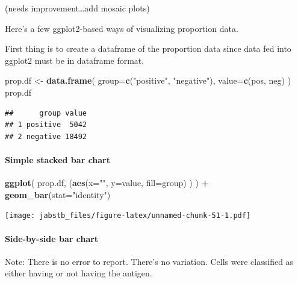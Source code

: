 \documentclass[]{book}
\newenvironment{Shaded}{\begin{snugshade}}{\end{snugshade}}
\newcommand{\DataTypeTok}[1]{\textcolor[rgb]{0.13,0.29,0.53}{#1}}
\newcommand{\KeywordTok}[1]{\textcolor[rgb]{0.13,0.29,0.53}{\textbf{#1}}}
\newcommand{\NormalTok}[1]{#1}
\newcommand{\OperatorTok}[1]{\textcolor[rgb]{0.81,0.36,0.00}{\textbf{#1}}}
\newcommand{\StringTok}[1]{\textcolor[rgb]{0.31,0.60,0.02}{#1}}
\let\oldparagraph\paragraph
\renewcommand{\paragraph}[1]{\oldparagraph{#1}\mbox{}}
\begin{document}
(needs improvement\ldots{}add mosaic plots)

Here's a few ggplot2-based ways of visualizing proportion data.

First thing is to create a dataframe of the proportion data since data fed into ggplot2 must be in dataframe format.

\begin{Shaded}
\begin{Highlighting}[]
\NormalTok{prop.df <-}\StringTok{ }\KeywordTok{data.frame}\NormalTok{(}
  \DataTypeTok{group=}\KeywordTok{c}\NormalTok{(}\StringTok{"positive"}\NormalTok{, }\StringTok{"negative"}\NormalTok{), }
  \DataTypeTok{value=}\KeywordTok{c}\NormalTok{(pos, neg)}
\NormalTok{  )}
\NormalTok{prop.df}
\end{Highlighting}
\end{Shaded}

\begin{verbatim}
##      group value
## 1 positive  5042
## 2 negative 18492
\end{verbatim}

\hypertarget{simple-stacked-bar-chart}{%
\paragraph{Simple stacked bar chart}\label{simple-stacked-bar-chart}}

\begin{Shaded}
\begin{Highlighting}[]
\KeywordTok{ggplot}\NormalTok{(}
\NormalTok{  prop.df,}
\NormalTok{  (}\KeywordTok{aes}\NormalTok{(}\DataTypeTok{x=}\StringTok{""}\NormalTok{, }
       \DataTypeTok{y=}\NormalTok{value, }
       \DataTypeTok{fill=}\NormalTok{group)}
\NormalTok{   )}
\NormalTok{  ) }\OperatorTok{+}
\StringTok{  }\KeywordTok{geom_bar}\NormalTok{(}\DataTypeTok{stat=}\StringTok{"identity"}\NormalTok{)}
\end{Highlighting}
\end{Shaded}

\texttt{[image: jabstb\_files/figure-latex/unnamed-chunk-51-1.pdf]}

\hypertarget{side-by-side-bar-chart}{%
\paragraph{Side-by-side bar chart}\label{side-by-side-bar-chart}}

Note: There is no error to report. There's no variation. Cells were classified as either having or not having the antigen.
\end{document}
